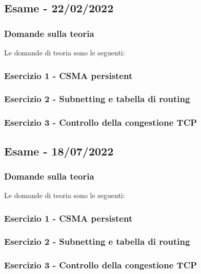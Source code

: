 \documentclass[a4paper]{article}
\begin{document}
	\subsection[\textbf{Esame - 22/02/2022}]{Esame - 22/02/2022}
	
	\subsubsection{Domande sulla teoria}
	Le domande di teoria sono le seguenti:
	
	\subsubsection{Esercizio 1 - CSMA persistent}
	
	\subsubsection{Esercizio 2 - Subnetting e tabella di routing}
	
	\subsubsection{Esercizio 3 - Controllo della congestione TCP}
	
	\newpage

	\subsection[\textbf{Esame - 18/07/2022}]{Esame - 18/07/2022}
	
	\subsubsection{Domande sulla teoria}
	Le domande di teoria sono le seguenti:
	
	\subsubsection{Esercizio 1 - CSMA persistent}
	
	\subsubsection{Esercizio 2 - Subnetting e tabella di routing}
	
	\subsubsection{Esercizio 3 - Controllo della congestione TCP}
	
\end{document}
